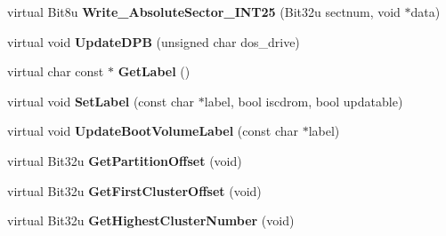 \begin{DoxyCompactItemize}
\item 
\hypertarget{classfatDrive_abc3063d8c0750657c05fea9f1591b5b0}{virtual Bit8u {\bfseries Write\-\_\-\-Absolute\-Sector\-\_\-\-I\-N\-T25} (Bit32u sectnum, void $\ast$data)}\label{classfatDrive_abc3063d8c0750657c05fea9f1591b5b0}

\item 
\hypertarget{classfatDrive_a454ea0d8d8d235cb56b79854608342db}{virtual void {\bfseries Update\-D\-P\-B} (unsigned char dos\-\_\-drive)}\label{classfatDrive_a454ea0d8d8d235cb56b79854608342db}

\item 
\hypertarget{classfatDrive_ada5c0b37156b6bd321abd7df5aeb5c9c}{virtual char const $\ast$ {\bfseries Get\-Label} ()}\label{classfatDrive_ada5c0b37156b6bd321abd7df5aeb5c9c}

\item 
\hypertarget{classfatDrive_ac30ac6871b0c1e0e60d2a4dda761fd1d}{virtual void {\bfseries Set\-Label} (const char $\ast$label, bool iscdrom, bool updatable)}\label{classfatDrive_ac30ac6871b0c1e0e60d2a4dda761fd1d}

\item 
\hypertarget{classfatDrive_ae44dc4ad74a126a3dee16c68a25dbb60}{virtual void {\bfseries Update\-Boot\-Volume\-Label} (const char $\ast$label)}\label{classfatDrive_ae44dc4ad74a126a3dee16c68a25dbb60}

\item 
\hypertarget{classfatDrive_a8abdc9360711c5b0b0b3a08b3378eb0b}{virtual Bit32u {\bfseries Get\-Partition\-Offset} (void)}\label{classfatDrive_a8abdc9360711c5b0b0b3a08b3378eb0b}

\item 
\hypertarget{classfatDrive_a9cb5e8576bdad72821ad924667e896ba}{virtual Bit32u {\bfseries Get\-First\-Cluster\-Offset} (void)}\label{classfatDrive_a9cb5e8576bdad72821ad924667e896ba}

\item 
\hypertarget{classfatDrive_acc19cc4c693b0c7e3bac06f78b058bed}{virtual Bit32u {\bfseries Get\-Highest\-Cluster\-Number} (void)}\label{classfatDrive_acc19cc4c693b0c7e3bac06f78b058bed}

\end{DoxyCompactItemize}
